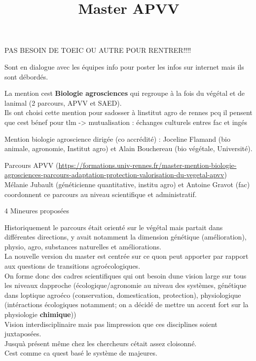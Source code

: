 \documentclass[
]{article}
\title{Master APVV}
\author{}
\date{}
\begin{document}
\maketitle

PAS BESOIN DE TOEIC OU AUTRE POUR RENTRER!!!!

Sont en dialogue avec les équipes info pour poster les infos sur
internet mais ils sont débordés.

La mention c\textquotesingle est \textbf{Biologie agrosciences} qui
regroupe à la fois du végétal et de l\textquotesingle animal (2
parcours, APVV et SAED).\\
Ils ont choisi cette mention pour s\textquotesingle adosser à
l\textquotesingle institut agro de rennes pcq il pensent que
c\textquotesingle est bénef pour tlm -\textgreater{} mutualisation :
échanges culturels entres fac et ingés

Mention biologie agroscience dirigée (co accrédité) : Joceline Flamand
(bio animale, agronomie, Institut agro) et Alain Bouchereau (bio
végétale, Université).

Parcours APVV
(\url{https://formations.univ-rennes.fr/master-mention-biologie-agrosciences-parcours-adaptation-protection-valorisation-du-vegetal-apvv})\\
Mélanie Jubault (généticienne quantitative, institu agro) et Antoine
Gravot (fac) coordonnent ce parcours au niveau scientifique et
administratif.

4 Mineures proposées

Historiquement le parcours était orienté sur le végétal mais partait
dans différentes directions, y avait notamment la dimension génétique
(amélioration), physio, agro, substances naturelles et améliorations.\\
La nouvelle version du master est centrée sur ce qu\textquotesingle on
peut apporter par rapport aux questions de transitions
agroécologiques.\\
On forme donc des cadres scientifiques qui ont besoin
d\textquotesingle une vision large sur tous les niveaux
d\textquotesingle approche (écologique/agronomie au niveau des systèmes,
génétique dans l\textquotesingle optique agroéco (conservation,
domestication, protection), physiologique (intéractions écologiques
notamment; on a décidé de mettre un accent fort sur la physiologie
\textbf{chimique}))\\
Vision interdisciplinaire mais pas l\textquotesingle impression que ces
disciplines soient juxtaposées.\\
Jusqu\textquotesingle à présent même chez les chercheurs
c\textquotesingle était assez cloisonné.\\
C\textquotesingle est comme ca qu\textquotesingle est basé le système de
majeures.
\end{document}

